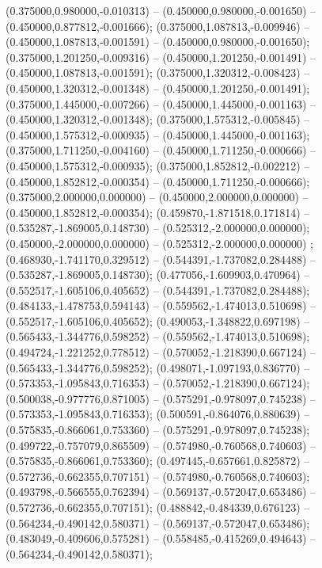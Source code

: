  (0.375000,0.980000,-0.010313) -- (0.450000,0.980000,-0.001650) -- (0.450000,0.877812,-0.001666);
 (0.375000,1.087813,-0.009946) -- (0.450000,1.087813,-0.001591) -- (0.450000,0.980000,-0.001650);
 (0.375000,1.201250,-0.009316) -- (0.450000,1.201250,-0.001491) -- (0.450000,1.087813,-0.001591);
 (0.375000,1.320312,-0.008423) -- (0.450000,1.320312,-0.001348) -- (0.450000,1.201250,-0.001491);
 (0.375000,1.445000,-0.007266) -- (0.450000,1.445000,-0.001163) -- (0.450000,1.320312,-0.001348);
 (0.375000,1.575312,-0.005845) -- (0.450000,1.575312,-0.000935) -- (0.450000,1.445000,-0.001163);
 (0.375000,1.711250,-0.004160) -- (0.450000,1.711250,-0.000666) -- (0.450000,1.575312,-0.000935);
 (0.375000,1.852812,-0.002212) -- (0.450000,1.852812,-0.000354) -- (0.450000,1.711250,-0.000666);
 (0.375000,2.000000,0.000000) -- (0.450000,2.000000,0.000000) -- (0.450000,1.852812,-0.000354);
 (0.459870,-1.871518,0.171814) -- (0.535287,-1.869005,0.148730) -- (0.525312,-2.000000,0.000000);
 (0.450000,-2.000000,0.000000) -- (0.525312,-2.000000,0.000000) ;
 (0.468930,-1.741170,0.329512) -- (0.544391,-1.737082,0.284488) -- (0.535287,-1.869005,0.148730);
 (0.477056,-1.609903,0.470964) -- (0.552517,-1.605106,0.405652) -- (0.544391,-1.737082,0.284488);
 (0.484133,-1.478753,0.594143) -- (0.559562,-1.474013,0.510698) -- (0.552517,-1.605106,0.405652);
 (0.490053,-1.348822,0.697198) -- (0.565433,-1.344776,0.598252) -- (0.559562,-1.474013,0.510698);
 (0.494724,-1.221252,0.778512) -- (0.570052,-1.218390,0.667124) -- (0.565433,-1.344776,0.598252);
 (0.498071,-1.097193,0.836770) -- (0.573353,-1.095843,0.716353) -- (0.570052,-1.218390,0.667124);
 (0.500038,-0.977776,0.871005) -- (0.575291,-0.978097,0.745238) -- (0.573353,-1.095843,0.716353);
 (0.500591,-0.864076,0.880639) -- (0.575835,-0.866061,0.753360) -- (0.575291,-0.978097,0.745238);
 (0.499722,-0.757079,0.865509) -- (0.574980,-0.760568,0.740603) -- (0.575835,-0.866061,0.753360);
 (0.497445,-0.657661,0.825872) -- (0.572736,-0.662355,0.707151) -- (0.574980,-0.760568,0.740603);
 (0.493798,-0.566555,0.762394) -- (0.569137,-0.572047,0.653486) -- (0.572736,-0.662355,0.707151);
 (0.488842,-0.484339,0.676123) -- (0.564234,-0.490142,0.580371) -- (0.569137,-0.572047,0.653486);
 (0.483049,-0.409606,0.575281) -- (0.558485,-0.415269,0.494643) -- (0.564234,-0.490142,0.580371);
